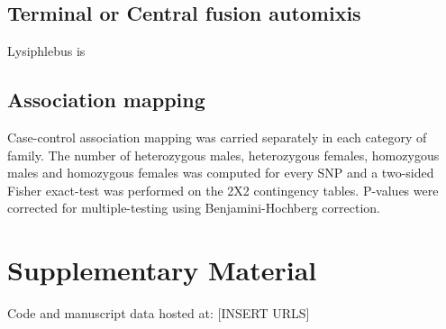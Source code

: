 \documentclass[11pt,a4paper]{report}
\begin{document}
\subsection*{Terminal or Central fusion automixis}
Lysiphlebus is 

\subsection*{Association mapping}
Case-control association mapping was carried separately in each category of family. The number of heterozygous males, heterozygous females, homozygous males and homozygous females was computed for every SNP and a two-sided Fisher exact-test was performed on the 2X2 contingency tables. P-values were corrected for multiple-testing using Benjamini-Hochberg correction. 

\section*{Supplementary Material}

Code and manuscript data hosted at: [INSERT URLS]


\fancyhead[L]{\slshape }

\end{document}
